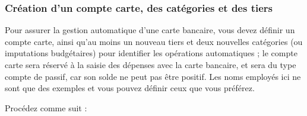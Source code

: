 \subsubsection{Création d'un compte carte, des catégories et des tiers}

Pour assurer la gestion automatique d'une carte bancaire, vous devez définir un compte carte, ainsi qu'au moins un nouveau tiers et deux nouvelles catégories (ou imputations budgétaires) pour identifier les opérations automatiques ; le compte carte sera réservé à la saisie des dépenses avec la carte bancaire, et sera du type compte de passif, car son solde ne peut pas être positif. Les noms employés ici ne sont que des exemples et vous pouvez définir ceux que vous préférez. 


Procédez comme suit :

